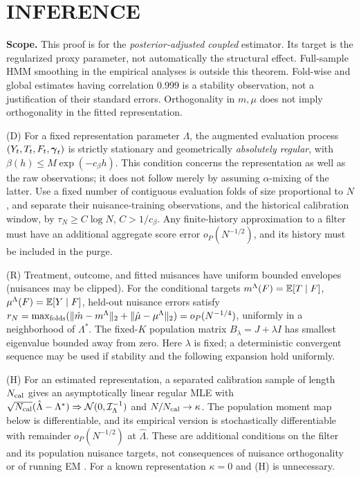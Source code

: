 \section{INFERENCE}
\label{app:proof_asym}
\textbf{Scope.} This proof is for the \emph{posterior-adjusted coupled} estimator. Its target is the regularized proxy parameter, not automatically the structural effect. Full-sample HMM smoothing in the empirical analyses is outside this theorem. Fold-wise and global estimates having correlation 0.999 is a stability observation, not a justification of their standard errors. Orthogonality in $m,\mu$ does not imply orthogonality in the fitted representation.

\begin{assumption}
\label{ass:hmm_gram}
(D) For a fixed representation parameter $\Lambda$, the augmented evaluation process $(Y_t,T_t,F_t,\boldsymbol{\gamma}_t)$ is strictly stationary and geometrically \emph{absolutely regular}, with $\beta(h)\le M\exp(-c_\beta h)$. This condition concerns the representation as well as the raw observations; it does not follow merely by assuming $\alpha$-mixing of the latter. Use a fixed number of contiguous evaluation folds of size proportional to $N$, and separate their nuisance-training observations, and the historical calibration window, by $\tau_N\ge C\log N$, $C>1/c_\beta$. Any finite-history approximation to a filter must have an additional aggregate score error $o_P(N^{-1/2})$, and its history must be included in the purge.

(R) Treatment, outcome, and fitted nuisances have uniform bounded envelopes (nuisances may be clipped). For the conditional targets $m^\Lambda(F)=\mathbb{E}[T\mid F]$, $\mu^\Lambda(F)=\mathbb{E}[Y\mid F]$, held-out nuisance errors satisfy $r_N=\max_{\rm folds}(\|\hat m-m^\Lambda\|_2+\|\hat\mu-\mu^\Lambda\|_2)=o_P(N^{-1/4})$, uniformly in a neighborhood of $\Lambda^*$. The fixed-$K$ population matrix $B_\lambda=J+\lambda I$ has smallest eigenvalue bounded away from zero. Here $\lambda$ is fixed; a deterministic convergent sequence may be used if stability and the following expansion hold uniformly.

(H) For an estimated representation, a separated calibration sample of length $N_{\rm cal}$ gives an asymptotically linear regular MLE with $\sqrt{N_{\rm cal}}(\hat\Lambda-\Lambda^*)\Rightarrow\mathcal N(0,\mathcal I_\Lambda^{-1})$ and $N/N_{\rm cal}\to\kappa$. The population moment map below is differentiable, and its empirical version is stochastically differentiable with remainder $o_P(N^{-1/2})$ at $\hat\Lambda$. These are additional conditions on the filter and its population nuisance targets, not consequences of nuisance orthogonality or of running EM \citep{leroux1992maximum,bickel1998asymptotic,douc2004asymptotic}. For a known representation $\kappa=0$ and (H) is unnecessary.
\end{assumption}

